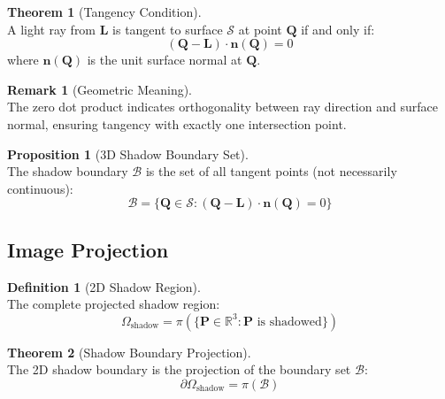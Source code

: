 \documentclass[12pt]{article}
\theoremstyle{definition}
\newtheorem{definition}{Definition}[section]
\newtheorem{theorem}{Theorem}[section]
\newtheorem{proposition}{Proposition}[section]
\newtheorem{remark}{Remark}[section]
\begin{document}
\begin{theorem}[Tangency Condition] ~\\
A light ray from $\mathbf{L}$ is tangent to surface $\mathcal{S}$ at point $\mathbf{Q}$ if and only if:
\begin{equation}
\boxed{(\mathbf{Q} - \mathbf{L}) \cdot \mathbf{n}(\mathbf{Q}) = 0} \label{eq:tangency}
\end{equation}
where $\mathbf{n}(\mathbf{Q})$ is the unit surface normal at $\mathbf{Q}$.
\end{theorem}

\begin{remark}[Geometric Meaning] ~\\
The zero dot product indicates orthogonality between ray direction and surface normal, ensuring tangency with exactly one intersection point.
\end{remark}

\begin{proposition}[3D Shadow Boundary Set] ~\\
The shadow boundary $\mathcal{B}$ is the set of all tangent points (not necessarily continuous):
\begin{equation}
\boxed{\mathcal{B} = \{\mathbf{Q} \in \mathcal{S} : (\mathbf{Q} - \mathbf{L}) \cdot \mathbf{n}(\mathbf{Q}) = 0\}} \label{eq:boundary_set}
\end{equation}
\end{proposition}

\subsection{Image Projection}

\begin{definition}[2D Shadow Region] ~\\
The complete projected shadow region:
\begin{equation}
\boxed{\Omega_{\text{shadow}} = \pi(\{\mathbf{P} \in \mathbb{R}^3 : \mathbf{P} \text{ is shadowed}\})} \label{eq:full_shadow}
\end{equation}
\end{definition}

\begin{theorem}[Shadow Boundary Projection] ~\\
The 2D shadow boundary is the projection of the boundary set $\mathcal{B}$:
\begin{equation}
\boxed{\partial\Omega_{\text{shadow}} = \pi(\mathcal{B})} \label{eq:boundary_proj}
\end{equation}
\end{theorem}
\end{document}

